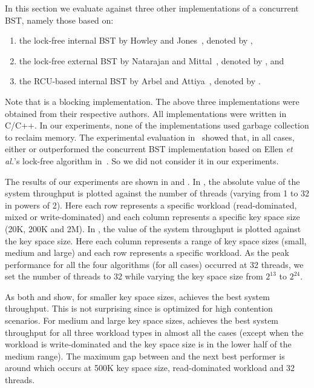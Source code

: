In this section we evaluate \CASTLE{} against three other implementations of a concurrent 
BST, namely those based on:
\begin{enumerate}[label=(\roman*)]
\item the lock-free internal BST by Howley and Jones~\cite{HowJon:2012:SPAA}, denoted by \HJBST{},
\item the lock-free external BST by Natarajan and Mittal~\cite{NatMit:2014:PPoPP}, denoted by \NMBST{}, and 
\item the RCU-based internal BST by Arbel and Attiya~\cite{ArbAtt:2014:PODC}, denoted by \CITRUS{}.
\end{enumerate}
Note that \CITRUS{} is a blocking implementation. The above three implementations were obtained from their respective authors. All implementations were written in C/C++. In our experiments, none of the implementations used garbage collection to reclaim memory. The experimental evaluation in~\cite{HowJon:2012:SPAA, NatMit:2014:PPoPP} showed that, in all cases,  either \HJBST{} or \NMBST{} outperformed the concurrent BST implementation based on Ellen \emph{et al.}'s lock-free algorithm in~\cite{EllFat+:2010:PODC}. So we did not consider it in our experiments. 



The results of our experiments are shown in   and . In , the absolute value of the system throughput is plotted against the number of threads (varying from 1 to 32 in powers of 2). Here each row represents a specific workload (read-dominated, mixed or write-dominated) and each column represents a specific key space size (20K, 200K and 2M). In , the value of the system throughput is plotted against the key space size. Here each column represents a range of key space sizes (small, medium and large) and each row represents a specific workload. As the peak performance for all the four algorithms (for all cases) occurred at 32 threads, we set the number of threads to 32 while varying the key space size from $2^{13}$ to $2^{24}$.

As both  and  show, for smaller key space sizes, \NMBST{} achieves the best system throughput. This is not surprising since \NMBST{} is optimized for high contention scenarios. For medium and large key space sizes, \CASTLE{} achieves the best system throughput for all three workload types in almost all the cases (except when the workload is write-dominated and the key space size is in the lower half of the medium range). The maximum gap between \CASTLE{} and the next best performer is around \castleMaximumgap{} which occurs at 500K key space size, read-dominated workload and 32 threads.

